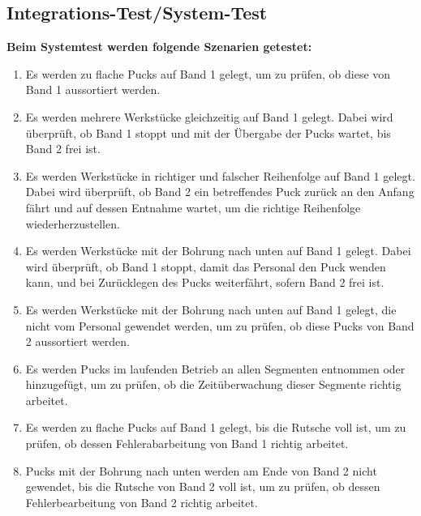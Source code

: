 \documentclass[oneside,a4paper,titlepage]{scrartcl} %
\begin{document}
\subsection{Integrations-Test/System-Test}
\textbf{Beim Systemtest werden folgende Szenarien getestet:}\\
\begin{enumerate}
    \item Es werden zu flache Pucks auf Band 1 gelegt, um zu prüfen, ob diese von Band 1 aussortiert werden.
    \item Es werden mehrere Werkstücke gleichzeitig auf Band 1 gelegt. Dabei wird überprüft, ob Band 1 stoppt und mit der Übergabe der Pucks wartet, bis Band 2 frei ist.
    \item Es werden Werkstücke in richtiger und falscher Reihenfolge auf Band 1 gelegt. Dabei wird überprüft, ob Band 2 ein betreffendes Puck zurück an den Anfang fährt und auf dessen Entnahme wartet, um die richtige Reihenfolge wiederherzustellen.
    \item Es werden Werkstücke mit der Bohrung nach unten auf Band 1 gelegt. Dabei wird überprüft, ob Band 1 stoppt, damit das Personal den Puck wenden kann, und bei Zurücklegen des Pucks weiterfährt, sofern Band 2 frei ist.
    \item Es werden Werkstücke mit der Bohrung nach unten auf Band 1 gelegt, die nicht vom Personal gewendet werden, um zu prüfen, ob diese Pucks von Band 2 aussortiert werden.
    \item Es werden Pucks im laufenden Betrieb an allen Segmenten entnommen oder hinzugefügt, um zu prüfen, ob die Zeitüberwachung dieser Segmente richtig arbeitet.
    \item Es werden zu flache Pucks auf Band 1 gelegt, bis die Rutsche voll ist, um zu prüfen, ob dessen Fehlerabarbeitung von Band 1 richtig arbeitet.
    \item Pucks mit der Bohrung nach unten werden am Ende von Band 2 nicht gewendet, bis die Rutsche von Band 2 voll ist, um zu prüfen, ob dessen Fehlerbearbeitung von Band 2 richtig arbeitet. 
\end{enumerate}

\newpage

\end{document}
